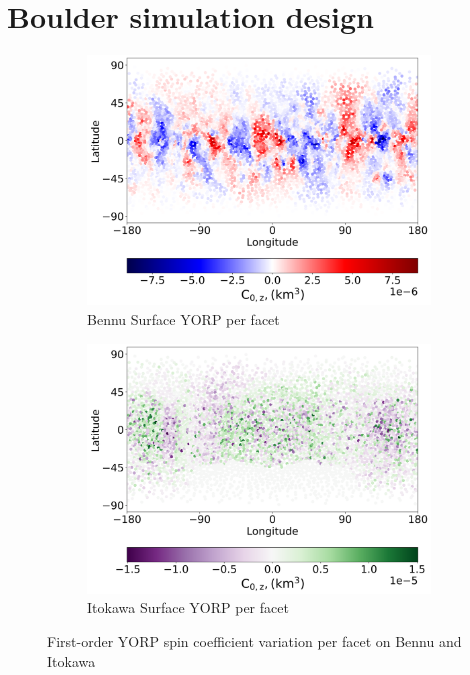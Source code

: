 \section{Boulder simulation design} \label{methods} %
\begin{figure}[t!]
    \begin{subfigure}{0.45\textwidth}
        \centering
        \includegraphics[width=\textwidth]{fig/bennu_base_facet_yorp.png}
        \caption{Bennu Surface YORP per facet}
    \end{subfigure}
    \hfill
    \begin{subfigure}{0.45\textwidth}
        \centering
        \includegraphics[width=\textwidth]{fig/itokawa_base_facet_yorp.png}
        \caption{Itokawa Surface YORP per facet}
    \end{subfigure}  
    \caption{First-order YORP spin coefficient variation per facet on Bennu and Itokawa}
    \label{fig:heatmaps}
\end{figure}
